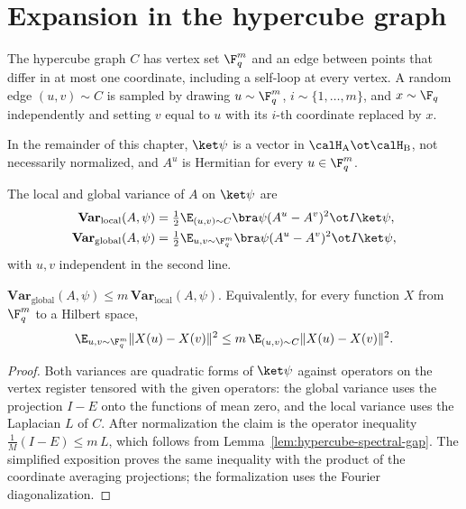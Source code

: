 \chapter{Expansion in the hypercube graph}
\label{chap:expansion}
\label{sec:expansion}

\begin{definition}\label{def:hypercube-graph}
	\leanok
	The hypercube graph $C$ has vertex set $\F_q^m$ and an edge between points
	that differ in at most one coordinate, including a self-loop at every
	vertex.  A random edge $(u,v)\sim C$ is sampled by drawing $u\sim\F_q^m$,
	$i\sim\{1,\ldots,m\}$, and $x\sim\F_q$ independently and setting $v$ equal
	to $u$ with its $i$-th coordinate replaced by $x$.
\end{definition}

In the remainder of this chapter, $\ket\psi$ is a vector in
$\calH_{\mathrm A}\ot\calH_{\mathrm B}$, not necessarily normalized, and
$A^u$ is Hermitian for every $u\in\F_q^m$.

\begin{definition}\label{def:local-and-variance}
	\leanok
	The local and global variance of $A$ on $\ket\psi$ are
	\begin{align*}
		\mathbf{Var}_{\mathrm{local}}(A,\psi)
		 & =\tfrac12\E_{(u,v)\sim C}\bra\psi(A^u-A^v)^2\ot I\ket\psi,   \\
		\mathbf{Var}_{\mathrm{global}}(A,\psi)
		 & =\tfrac12\E_{u,v\sim\F_q^m}\bra\psi(A^u-A^v)^2\ot I\ket\psi,
	\end{align*}
	with $u,v$ independent in the second line.
\end{definition}

\begin{lemma}\label{lem:local-to-global}
	\leanok
	$\mathbf{Var}_{\mathrm{global}}(A,\psi)\le m\,\mathbf{Var}_{\mathrm{local}}(A,\psi)$.
	Equivalently, for every function $X$ from $\F_q^m$ to a Hilbert space,
	\[
		\E_{u,v\sim\F_q^m}\|X(u)-X(v)\|^2\le m\,\E_{(u,v)\sim C}\|X(u)-X(v)\|^2.
	\]
\end{lemma}
\begin{proof}
	\leanok
	Both variances are quadratic forms of $\ket\psi$ against operators on the
	vertex register tensored with the given operators: the global variance
	uses the projection $I-E$ onto the functions of mean zero, and the local
	variance uses the Laplacian $L$ of $C$.  After normalization the claim is
	the operator inequality $\frac1M(I-E)\le m\,L$, which follows from
	Lemma~\ref{lem:hypercube-spectral-gap}.  The simplified exposition proves
	the same inequality with the product of the coordinate averaging
	projections; the formalization uses the Fourier diagonalization.
\end{proof}

